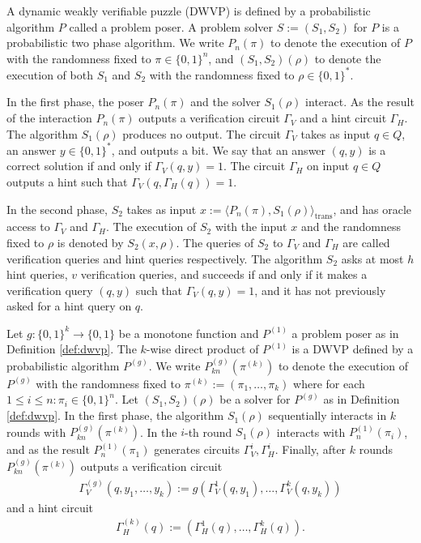 \begin{definition}
  \label{def:dwvp}
  A dynamic weakly verifiable puzzle (DWVP) is defined by a probabilistic algorithm $P$
  called a problem poser.
  A problem solver $S := (S_1, S_2)$ for $P$ is a probabilistic two phase algorithm.
  We write $P_n(\pi)$ to denote the execution of $P$ with the randomness fixed to $\pi \in \{0,1\}^n$, and $(S_1,S_2)(\rho)$
  to denote the execution of both $S_1$ and $S_2$ with the randomness fixed to $\rho \in \{0,1\}^{*}$.

  In the first phase, the poser $P_n(\pi)$ and the solver $S_1(\rho)$ interact.
  As the result of the interaction $P_n(\pi)$ outputs a verification circuit $\Gamma_{V}$ and a hint circuit $\Gamma_{H}$.
  The algorithm $S_1(\rho)$ produces no output.
  The circuit $\Gamma_{V}$ takes as input $q \in Q$, an answer $y \in \{0,1\}^*$,
  and outputs a bit. We say that an answer $(q,y)$ is a correct solution if and only if $\Gamma_V(q,y) = 1$.
  The circuit $\Gamma_H$ on input $q \in Q$ outputs a hint such that $\Gamma_V(q,\Gamma_H(q)) = 1$.

  In the second phase, $S_2$ takes as input $x := \langle P_n(\pi), S_1(\rho) \rangle_{\text{trans}}$,
  and has oracle access to $\Gamma_V$ and $\Gamma_H$.
  The execution of $S_2$ with the input $x$ and the randomness fixed to $\rho$
  is denoted by $S_2(x, \rho)$. The queries of $S_2$ to $\Gamma_V$ and $\Gamma_H$ are called verification queries and hint queries respectively.
  The algorithm $S_2$ asks at most $h$ hint queries, $v$ verification queries, and succeeds if and only if
  it makes a verification query $(q,y)$ such that $\Gamma_V(q,y) = 1$, and it has not previously asked for a hint query on $q$.
\end{definition}
%
\begin{definition}
  Let $g: \{0,1\}^{k} \rightarrow \{0,1\}$ be a monotone function and $P^{(1)}$ a problem poser as in Definition \ref{def:dwvp}.
  The $k$-wise direct product of $P^{(1)}$ is a DWVP defined by a probabilistic algorithm $P^{(g)}$.
  We write $P_{kn}^{(g)}(\pi^{(k)})$ to denote the execution of $P^{(g)}$ with the randomness fixed to $\pi^{(k)} := (\pi_1, \dots, \pi_k)$
  where for each $1 \leq i \leq n : \pi_i \in \{0,1\}^n.$
  Let $(S_1, S_2)(\rho)$ be a solver for $P^{(g)}$ as in Definition \ref{def:dwvp}.
  In the first phase, the algorithm $S_1(\rho)$ sequentially interacts in $k$ rounds with $P_{kn}^{(g)}(\pi^{(k)})$.
  In the $i$-th round $S_1(\rho)$ interacts with $P_n^{(1)}(\pi_i)$,
  and as the result $P_{n}^{(1)}(\pi_1)$ generates circuits $\Gamma_V^i, \Gamma_H^i$.
  Finally, after $k$ rounds $P_{kn}^{(g)}(\pi^{(k)})$ outputs a verification circuit
\begin{align*}
  \Gamma_V^{(g)} (q, y_1, \dots, y_k) := g(\Gamma_V^{1}(q, y_1), \dots, \Gamma_V^{k}(q, y_k))
\end{align*}
and a hint circuit
\begin{align*}
  \Gamma_H^{(k)} (q) := (\Gamma_H^{1}(q), \dots, \Gamma_H^{k}(q)).
\end{align*}
\end{definition}

